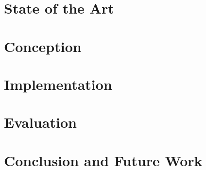\documentclass[english, BCOR=6mm, twoside=true, open=right]{tudscrreprt}
\begin{document}
\chapter{State of the Art}\label{chapter:state-of-the-art}



% 

\chapter{Conception}




\chapter{Implementation}



\chapter{Evaluation}



\chapter{Conclusion and Future Work}



\newpage
{}
\listoffigures

\newpage
{}
\listoftables

\newpage
{}
\lstlistoflistings

\end{document}
